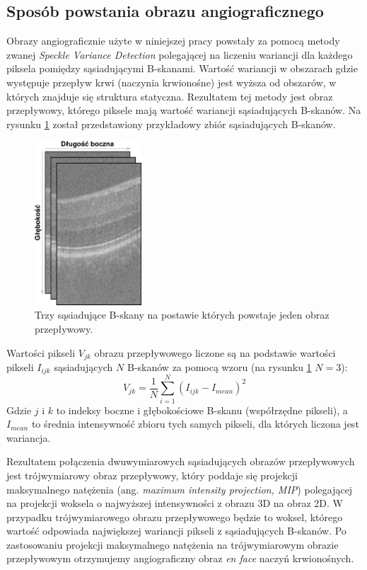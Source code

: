 \subsection{Sposób powstania obrazu angiograficznego}

Obrazy angiograficznie użyte w niniejszej pracy powstały za pomocą metody zwanej \textit{Speckle Variance Detection} polegającej na liczeniu wariancji dla każdego piksela pomiędzy sąsiadującymi B-skanami. Wartość wariancji w obszarach gdzie występuje przepływ krwi (naczynia krwionośne) jest wyższa od obszarów, w których znajduje się struktura statyczna. Rezultatem tej metody jest obraz przepływowy, którego piksele mają wartość wariancji sąsiadujących B-skanów. Na rysunku \ref{fig:obrazowanie_oct:speckle_variance} został przedstawiony przykładowy zbiór sąsiadujących B-skanów.

\begin{figure}[H]
	\centering
	\includegraphics[width=4cm]{gfx/speckle_variance}
	\caption{Trzy sąsiadujące B-skany na postawie których powstaje jeden obraz przepływowy.}
	\label{fig:obrazowanie_oct:speckle_variance}
\end{figure}

Wartości pikseli $V_{jk}$ obrazu przepływowego liczone są na podstawie wartości pikseli $I_{ijk}$ sąsiadujących $N$ B-skanów za pomocą wzoru (na rysunku \ref{fig:obrazowanie_oct:speckle_variance} $N=3$):
\begin{equation}
V_{jk} = \frac{1}{N} \displaystyle\sum_{i=1}^{N}(I_{ijk} - I_{mean})^2
\end{equation}
Gdzie $j$ i $k$ to indeksy boczne i głębokościowe B-skanu (współrzędne pikseli), a $I_{mean}$ to średnia intensywność zbioru tych samych pikseli, dla których liczona jest wariancja.

Rezultatem połączenia dwuwymiarowych sąsiadujących obrazów przepływowych jest trójwymiarowy obraz przepływowy, który poddaje się projekcji maksymalnego natężenia (ang. \textit{maximum intensity projection, MIP}) polegającej na projekcji woksela o najwyższej intensywności z obrazu 3D na obraz 2D. W przypadku trójwymiarowego obrazu przepływowego będzie to woksel, którego wartość odpowiada największej wariancji pikseli z sąsiadujących B-skanów. Po zastosowaniu projekcji maksymalnego natężenia na trójwymiarowym obrazie przepływowym otrzymujemy angiograficzny obraz \textit{en face} naczyń krwionośnych.

